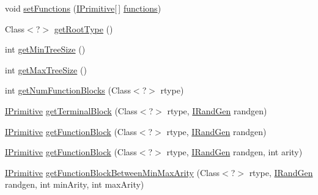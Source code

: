 \begin{DoxyCompactItemize}
\item 
void \hyperlink{classnet_1_1sf_1_1jclec_1_1exprtree_1_1_expr_tree_schema_a08e0cc54b355195616c1b4b4fdd6b741}{set\-Functions} (\hyperlink{interfacenet_1_1sf_1_1jclec_1_1exprtree_1_1_i_primitive}{I\-Primitive}\mbox{[}$\,$\mbox{]} \hyperlink{classnet_1_1sf_1_1jclec_1_1exprtree_1_1_expr_tree_schema_aca234d53fec87216b84803146e1b23c6}{functions})
\item 
Class$<$?$>$ \hyperlink{classnet_1_1sf_1_1jclec_1_1exprtree_1_1_expr_tree_schema_ae6578b6e75101c8a9ada29d7e03b5dc5}{get\-Root\-Type} ()
\item 
int \hyperlink{classnet_1_1sf_1_1jclec_1_1exprtree_1_1_expr_tree_schema_ad49e4ffeebe1eb3c422f34b1ca538832}{get\-Min\-Tree\-Size} ()
\item 
int \hyperlink{classnet_1_1sf_1_1jclec_1_1exprtree_1_1_expr_tree_schema_a430bca305225d072c19d8d5e91e57df6}{get\-Max\-Tree\-Size} ()
\item 
int \hyperlink{classnet_1_1sf_1_1jclec_1_1exprtree_1_1_expr_tree_schema_af11961a8c6617b0f9586395214e3b598}{get\-Num\-Function\-Blocks} (Class$<$?$>$ rtype)
\item 
\hyperlink{interfacenet_1_1sf_1_1jclec_1_1exprtree_1_1_i_primitive}{I\-Primitive} \hyperlink{classnet_1_1sf_1_1jclec_1_1exprtree_1_1_expr_tree_schema_a759d602a5fdaacdf143fb1032f025f3c}{get\-Terminal\-Block} (Class$<$?$>$ rtype, \hyperlink{interfacenet_1_1sf_1_1jclec_1_1util_1_1random_1_1_i_rand_gen}{I\-Rand\-Gen} randgen)
\item 
\hyperlink{interfacenet_1_1sf_1_1jclec_1_1exprtree_1_1_i_primitive}{I\-Primitive} \hyperlink{classnet_1_1sf_1_1jclec_1_1exprtree_1_1_expr_tree_schema_a01f03482fb411f631134059614046a72}{get\-Function\-Block} (Class$<$?$>$ rtype, \hyperlink{interfacenet_1_1sf_1_1jclec_1_1util_1_1random_1_1_i_rand_gen}{I\-Rand\-Gen} randgen)
\item 
\hyperlink{interfacenet_1_1sf_1_1jclec_1_1exprtree_1_1_i_primitive}{I\-Primitive} \hyperlink{classnet_1_1sf_1_1jclec_1_1exprtree_1_1_expr_tree_schema_a4388f39f3a8afe57d292990eff11ccbf}{get\-Function\-Block} (Class$<$?$>$ rtype, \hyperlink{interfacenet_1_1sf_1_1jclec_1_1util_1_1random_1_1_i_rand_gen}{I\-Rand\-Gen} randgen, int arity)
\item 
\hyperlink{interfacenet_1_1sf_1_1jclec_1_1exprtree_1_1_i_primitive}{I\-Primitive} \hyperlink{classnet_1_1sf_1_1jclec_1_1exprtree_1_1_expr_tree_schema_a83ca8d577369144608f7c63b7ab7e00f}{get\-Function\-Block\-Between\-Min\-Max\-Arity} (Class$<$?$>$ rtype, \hyperlink{interfacenet_1_1sf_1_1jclec_1_1util_1_1random_1_1_i_rand_gen}{I\-Rand\-Gen} randgen, int min\-Arity, int max\-Arity)

\end{DoxyCompactItemize}
